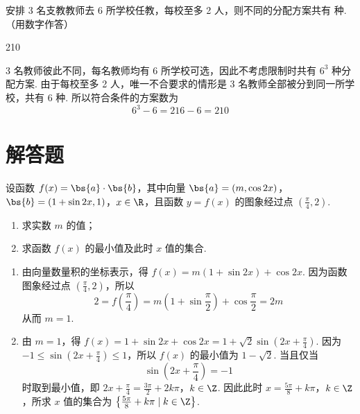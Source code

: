 \begin{problem}
安排 3 名支教教师去 6 所学校任教，每校至多 2 人，则不同的分配方案共有\fillinblank{} 种. （用数字作答）
\end{problem}

\begin{answer}
210
\end{answer}

\begin{solution}
3 名教师彼此不同，每名教师均有 6 所学校可选，因此不考虑限制时共有 \(6^3\) 种分配方案. 由于每校至多 2 人，唯一不合要求的情形是 3 名教师全部被分到同一所学校，共有 \(6\) 种. 所以符合条件的方案数为
\[
6^3-6=216-6=210
\]
\end{solution}

\section{解答题}

\begin{problem}
设函数 \( f(x) = \bs{a} \cdot \bs{b} \)，其中向量 \( \bs{a} = (m, \cos 2x) \)，\( \bs{b} = (1 + \sin 2x, 1) \)，\( x \in \R \)，且函数 \( y = f(x) \) 的图象经过点 \( \left(\frac{\pi}{4}, 2\right) \).
\begin{enumerate}
\item 求实数 \(m\) 的值；
\item 求函数 \( f(x) \) 的最小值及此时 \(x\) 值的集合.
\end{enumerate}
\end{problem}

\begin{solution}
\begin{enumerate}
\item 由向量数量积的坐标表示，得 \(f(x)=m(1+\sin 2x)+\cos 2x\). 因为函数图象经过点 \(\left(\frac{\pi}{4},2\right)\)，所以
\[
2=f\left(\frac{\pi}{4}\right)=m\left(1+\sin\frac{\pi}{2}\right)+\cos\frac{\pi}{2}=2m
\]
从而 \(m=1\).
\item 由 \(m=1\)，得 \(f(x)=1+\sin 2x+\cos 2x=1+\sqrt{2}\sin\left(2x+\frac{\pi}{4}\right)\). 因为 \(-1\leqslant\sin\left(2x+\frac{\pi}{4}\right)\leqslant1\)，所以 \(f(x)\) 的最小值为 \(1-\sqrt{2}\). 当且仅当
\[
\sin\left(2x+\frac{\pi}{4}\right)=-1
\]
时取到最小值，即 \(2x+\frac{\pi}{4}=\frac{3\pi}{2}+2k\pi\)，\(k\in\Z\). 因此此时 \(x=\frac{5\pi}{8}+k\pi\)，\(k\in\Z\)，所求 \(x\) 值的集合为 \(\left\{\frac{5\pi}{8}+k\pi\mid k\in\Z\right\}\).
\end{enumerate}
\end{solution}

